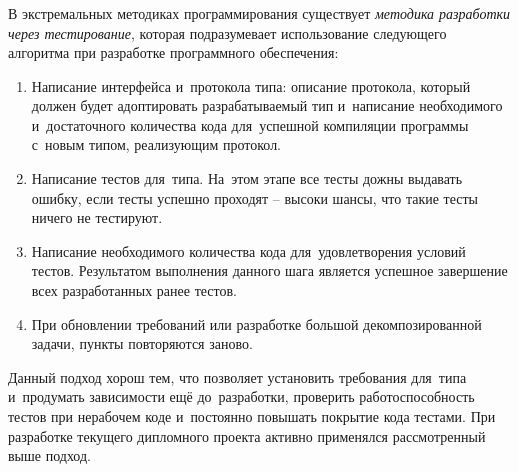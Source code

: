 \subsubsection{}
\label{sec:testing:unit:tdd}

В экстремальных методиках программирования существует \textit{методика разработки через тестирование}, которая подразумевает использование следующего алгоритма при разработке программного обеспечения:

\begin{enumerate}
	\item Написание интерфейса и~протокола типа: описание протокола, который должен будет адоптировать разрабатываемый тип и~написание необходимого и~достаточного количества кода для~успешной компиляции программы с~новым типом, реализующим протокол.
	\item Написание тестов для~типа. На~этом этапе все тесты дожны выдавать ошибку, если тесты успешно проходят -- высоки шансы, что такие тесты ничего не тестируют.
	\item Написание необходимого количества кода для~удовлетворения условий тестов. Результатом выполнения данного шага является успешное завершение всех разработанных ранее тестов.
	\item При обновлении требований или разработке большой декомпозированной задачи, пункты повторяются заново.
\end{enumerate}

Данный подход хорош тем, что позволяет установить требования для~типа и~продумать зависимости ещё до~разработки, проверить работоспособность тестов при нерабочем коде и~постоянно повышать покрытие кода тестами. При разработке текущего дипломного проекта активно применялся рассмотренный выше подход.